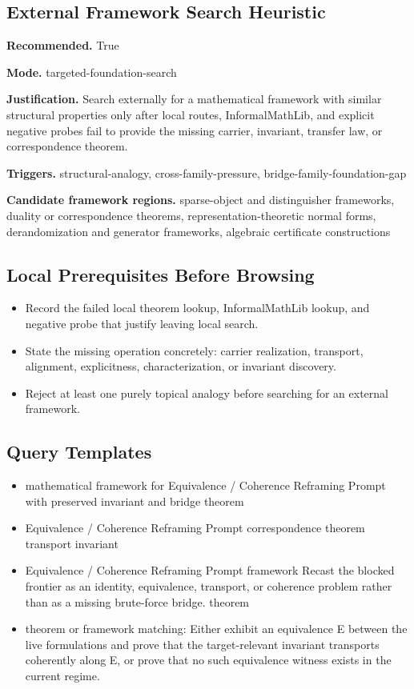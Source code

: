 \documentclass[11pt]{article}
\begin{document}
\subsection*{External Framework Search Heuristic}
\textbf{Recommended.} True

\textbf{Mode.} targeted-foundation-search

\textbf{Justification.} Search externally for a mathematical framework with similar structural properties only after local routes, InformalMathLib, and explicit negative probes fail to provide the missing carrier, invariant, transfer law, or correspondence theorem.

\textbf{Triggers.} structural-analogy, cross-family-pressure, bridge-family-foundation-gap

\textbf{Candidate framework regions.} sparse-object and distinguisher frameworks, duality or correspondence theorems, representation-theoretic normal forms, derandomization and generator frameworks, algebraic certificate constructions

\subsection*{Local Prerequisites Before Browsing}
\begin{itemize}[leftmargin=*,itemsep=0.2em]
\item Record the failed local theorem lookup, InformalMathLib lookup, and negative probe that justify leaving local search.
\item State the missing operation concretely: carrier realization, transport, alignment, explicitness, characterization, or invariant discovery.
\item Reject at least one purely topical analogy before searching for an external framework.
\end{itemize}
\subsection*{Query Templates}
\begin{itemize}[leftmargin=*,itemsep=0.2em]
\item mathematical framework for Equivalence / Coherence Reframing Prompt with preserved invariant and bridge theorem
\item Equivalence / Coherence Reframing Prompt correspondence theorem transport invariant
\item Equivalence / Coherence Reframing Prompt framework Recast the blocked frontier as an identity, equivalence, transport, or coherence problem rather than as a missing brute-force bridge. theorem
\item theorem or framework matching: Either exhibit an equivalence E between the live formulations and prove that the target-relevant invariant transports coherently along E, or prove that no such equivalence witness exists in the current regime.
\end{itemize}
\end{document}
